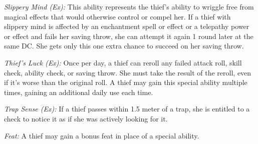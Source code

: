 \textit{Slippery Mind (Ex):} This ability represents the thief's ability to wriggle free from magical effects that would otherwise control or compel her. If a thief with slippery mind is affected by an enchantment spell or effect or a telepathy power or effect and fails her saving throw, she can attempt it again 1 round later at the same DC. She gets only this one extra chance to succeed on her saving throw.

\textit{Thief's Luck (Ex):} Once per day, a thief can reroll any failed attack roll, skill check, ability check, or saving throw. She must take the result of the reroll, even if it's worse than the original roll. A thief may gain this special ability multiple times, gaining an additional daily use each time.

\textit{Trap Sense (Ex):} If a thief passes within 1.5 meter of a trap, she is entitled to a  check to notice it as if she was actively looking for it.

\textit{Feat:} A thief may gain a bonus feat in place of a special ability.





